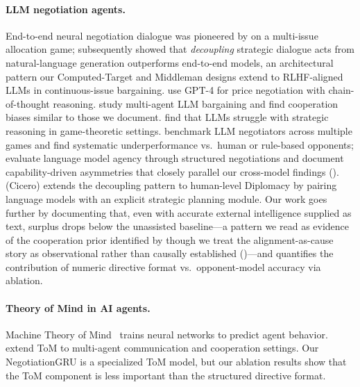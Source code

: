 \documentclass[11pt,a4paper]{article}
\begin{document}
\paragraph{LLM negotiation agents.}
End-to-end neural negotiation dialogue was pioneered by \citet{lewis2017deal} on a multi-issue allocation game; \citet{he2018decoupling} subsequently showed that \emph{decoupling} strategic dialogue acts from natural-language generation outperforms end-to-end models, an architectural pattern our Computed-Target and Middleman designs extend to RLHF-aligned LLMs in continuous-issue bargaining. \citet{fu2023improving} use GPT-4 for price negotiation with chain-of-thought reasoning. \citet{abdelnabi2024cooperation} study multi-agent LLM bargaining and find cooperation biases similar to those we document. \citet{gandhi2023strategic} find that LLMs struggle with strategic reasoning in game-theoretic settings. \citet{bianchi2024llm} benchmark LLM negotiators across multiple games and find systematic underperformance vs.\ human or rule-based opponents; \citet{davidson2024evaluating} evaluate language model agency through structured negotiations and document capability-driven asymmetries that closely parallel our cross-model findings (). \citet{bakhtin2022human} (Cicero) extends the decoupling pattern to human-level Diplomacy by pairing language models with an explicit strategic planning module. Our work goes further by documenting that, even with accurate external intelligence supplied as text, surplus drops below the unassisted baseline---a pattern we read as evidence of the cooperation prior identified by \citet{perez2022discovering,sharma2023sycophancy} though we treat the alignment-as-cause story as observational rather than causally established ()---and quantifies the contribution of numeric directive format vs.\ opponent-model accuracy via ablation.

\paragraph{Theory of Mind in AI agents.}
Machine Theory of Mind~\citep{rabinowitz2018machine} trains neural networks to predict agent behavior. \citet{wang2022tom2c} extend ToM to multi-agent communication and cooperation settings. Our NegotiationGRU is a specialized ToM model, but our ablation results show that the ToM component is less important than the structured directive format.
\end{document}
